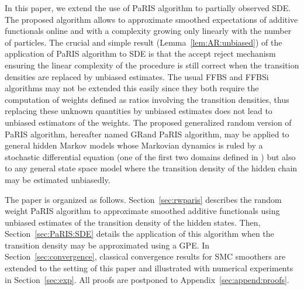 \documentclass[12pt]{article}
\newcommand{\1}{\mathrm{1}}
\begin{document}
In this paper, we extend the use of  PaRIS algorithm to partially observed SDE. 
The proposed algorithm allows to approximate smoothed expectations of additive functionals online and with a complexity growing only linearly with the number of particles. The crucial and simple result (Lemma~\ref{lem:AR:unbiased}) of the application of PaRIS algorithm to SDE is that the accept reject mechanism ensuring the linear complexity of the procedure is still correct when the transition densities are replaced by unbiased estimates. The usual FFBS and FFBSi algorithms may not be extended this easily since they both require the computation of weights defined as ratios involving the transition densities, thus replacing these unknown quantities by unbiased estimates does not lead to unbiased estimators of the weights. The proposed generalized random version of PaRIS algorithm, hereafter named GRand PaRIS algorithm, may be applied to general hidden Markov models whose Markovian dynamics is ruled by a stochastic differential equation (one of the first two domains defined in \cite{beskos:papaspiliopoulos:roberts:fearnhead:2006}) but also to any general state space model where the transition density of the hidden chain may be estimated unbiasedly.

The paper is organized as follows. Section~\ref{sec:rwparis} describes the random weight PaRIS algorithm to approximate smoothed additive functionals using unbiased estimates of the transition density of the hidden states. 
Then, Section~\ref{sec:PaRIS:SDE} details the application of this algorithm when the transition density may be approximated using a GPE. 
In Section~\ref{sec:convergence}, classical convergence results for SMC smoothers are extended to the setting of this paper and illustrated with numerical experiments in Section~\ref{sec:exp}. 
All proofs are postponed to Appendix~\ref{sec:append:proofs}.
\end{document}
